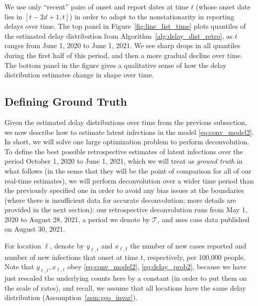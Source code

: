 \documentclass[sts]{imsart}
\def\T{\mathsf{T}}
\def\T{\mathcal{T}}
\theoremstyle{plain}
\theoremstyle{definition}
\theoremstyle{remark}
\begin{document}
We use only ``recent'' pairs of onset and report dates at time $t$ (whose onset
date lies in $[t-2d+1, t]$) in order to adapt to the nonstationarity in
reporting delays over time. The top panel in Figure~\ref{fig:line_list_time}
plots quantiles of the estimated delay distribution from
Algorithm~\ref{alg:delay_dist_retro}, as $t$ ranges from June 1, 2020 to June 1,
2021. We see sharp drops in all quantiles during the first half of this period,
and then a more gradual decline over time. The bottom panel in the figure gives
a qualitative sense of how the delay distribution estimates change in shape over
time.

\subsection{Defining Ground Truth}
\label{sec:ground_truth}

Given the estimated delay distributions over time from the previous subsection, 
we now describe how to estimate latent infections in the model
\eqref{eq:conv_model2}. In short, we will solve one large optimization problem
to perform deconvolution. To define the best possible retrospective estimates of
latent infections over the period October 1, 2020 to June 1, 2021, which we will
treat as \emph{ground truth} in what follows (in the sense that they will be the
point of comparison for all of our real-time estimates), we will perform
deconvolution over a wider time period than the previously specified one in
order to avoid any bias issues at the boundaries (where there is insufficient
data for accurate deconvolution; more details are provided in the next
section): our retrospective deconvolution runs from May 1, 2020 to August 28,
2021, a period we denote by $\T$, and uses case data published on August 30,
2021. 

For location $\ell$, denote by $y_{\ell,t}$ and $x_{\ell,t}$ the number of new
cases reported and number of new infections that onset at time $t$,
respectively, per 100,000 people. Note that $y_{\ell,t},x_{\ell,t}$ obey
\eqref{eq:conv_model2}, \eqref{eq:delay_prob2}, because we have just rescaled
the underlying counts here by a constant (in order to put them on the scale of
rates), and recall, we assume that all locations have the same delay
distribution (Assumption~\ref{asm:geo_invar}).
\end{document}
